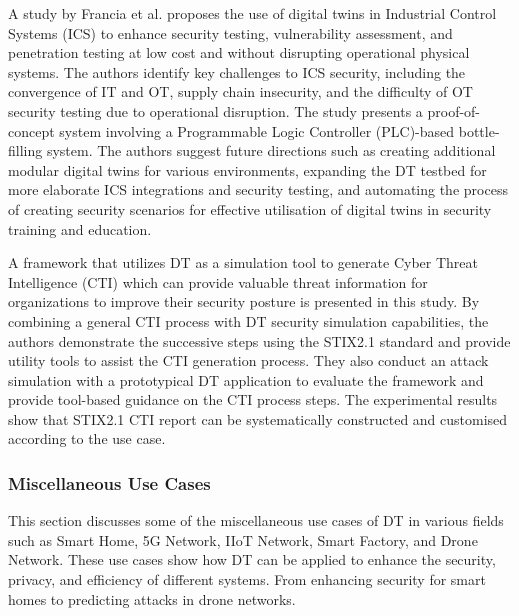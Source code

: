 A study by Francia et al.\cite{franciaDigitalTwinsIndustrial2021} proposes the use of digital twins in Industrial Control Systems (ICS) to enhance security testing, vulnerability assessment, and penetration testing at low cost and without disrupting operational physical systems. The authors identify key challenges to ICS security, including the convergence of IT and OT, supply chain insecurity, and the difficulty of OT security testing due to operational disruption. The study presents a proof-of-concept system involving a Programmable Logic Controller (PLC)-based bottle-filling system. The authors suggest future directions such as creating additional modular digital twins for various environments, expanding the DT testbed for more elaborate ICS integrations and security testing, and automating the process of creating security scenarios for effective utilisation of digital twins in security training and education.

A framework that utilizes DT as a simulation tool to generate Cyber Threat Intelligence (CTI) which can provide valuable threat information for organizations to improve their security posture is presented in this study\cite{dietzHarnessingDigitalTwin2022}. By combining a general CTI process with DT security simulation capabilities, the authors demonstrate the successive steps using the STIX2.1 standard and provide utility tools to assist the CTI generation process. They also conduct an attack simulation with a prototypical DT application to evaluate the framework and provide tool-based guidance on the CTI process steps. The experimental results show that STIX2.1 CTI report can be systematically constructed and customised according to the use case. 



\subsubsection{Miscellaneous Use Cases } 
This section discusses some of the miscellaneous use cases of DT in various fields such as Smart Home, 5G Network, IIoT Network, Smart Factory, and Drone Network. These use cases show how DT can be applied to enhance the security, privacy, and efficiency of different systems. From enhancing security for smart homes to predicting attacks in drone networks.
  

